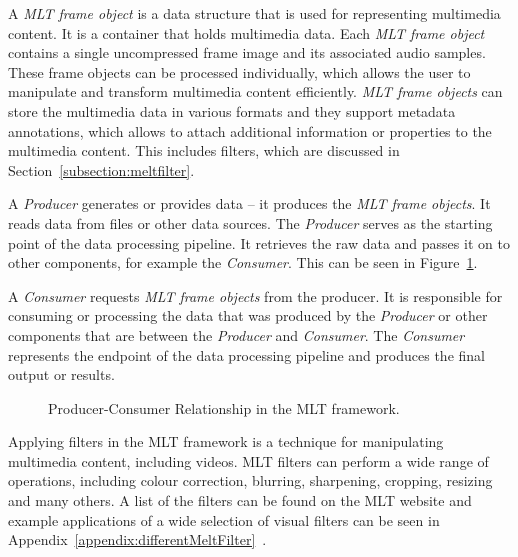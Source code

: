 \documentclass[../MasterThesis.tex]{subfiles}
\begin{document}
A \textit{MLT frame object} is a data structure that is used for representing multimedia content. 
It is a container that holds multimedia data. Each \textit{MLT frame object} contains a single uncompressed frame image and its associated audio samples. These frame objects can be processed individually, which allows the user to manipulate and transform multimedia content efficiently.
\textit{MLT frame objects} can store the multimedia data in various formats and they support metadata annotations, which allows to attach additional information or properties to the multimedia content. This includes filters, which are discussed in Section~\ref{subsection:meltfilter}.


A \textit{Producer} generates or provides data -- it produces the \textit{MLT frame objects}. 
It reads data from files or other data sources. The \textit{Producer} serves as the starting point of the data processing pipeline. It retrieves the raw data and passes it on to other components, for example the \textit{Consumer}. This can be seen in Figure~\ref{fig:producer_consumer}.

A \textit{Consumer} requests \textit{MLT frame objects} from the producer.
It is responsible for consuming or processing the data that was produced by the \textit{Producer} or other components that are between the \textit{Producer} and \textit{Consumer}. 
The \textit{Consumer} represents the endpoint of the data processing pipeline and produces the final output or results.



\begin{figure}[H]
	\centering
	\caption{Producer-Consumer Relationship in the MLT framework.}
	\label{fig:producer_consumer}
\end{figure}

Applying filters in the MLT framework is a technique for manipulating multimedia content, including videos. 
MLT filters can perform a wide range of operations, including colour correction, blurring, sharpening, cropping, resizing and many others. A list of the filters can be found on the MLT website and example applications of a wide selection of visual filters can be seen in Appendix~\ref{appendix:differentMeltFilter}~\cite{melt_filters}.
\end{document}
